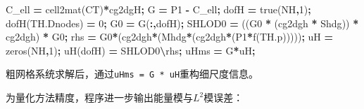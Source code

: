 \documentclass[
]{article}
\newenvironment{Shaded}{\begin{snugshade}}{\end{snugshade}}
\newcommand{\FloatTok}[1]{\textcolor[rgb]{0.00,0.00,0.81}{#1}}
\newcommand{\NormalTok}[1]{#1}
\newcommand{\OperatorTok}[1]{\textcolor[rgb]{0.81,0.36,0.00}{\textbf{#1}}}
\newcommand{\VariableTok}[1]{\textcolor[rgb]{0.00,0.00,0.00}{#1}}
\begin{document}
\begin{Shaded}
\begin{Highlighting}[]
\VariableTok{C\_ell} \OperatorTok{=} \VariableTok{cell2mat}\NormalTok{(}\VariableTok{CT}\NormalTok{)}\OperatorTok{*}\VariableTok{cg2dgH}\OperatorTok{;}
\VariableTok{G} \OperatorTok{=} \VariableTok{P1} \OperatorTok{{-}} \VariableTok{C\_ell}\OperatorTok{;}
\VariableTok{dofH} \OperatorTok{=} \VariableTok{true}\NormalTok{(}\VariableTok{NH}\OperatorTok{,}\FloatTok{1}\NormalTok{)}\OperatorTok{;}
\VariableTok{dofH}\NormalTok{(}\VariableTok{TH}\NormalTok{.}\VariableTok{Dnodes}\NormalTok{) }\OperatorTok{=} \FloatTok{0}\OperatorTok{;}
\VariableTok{G0} \OperatorTok{=} \VariableTok{G}\NormalTok{(}\OperatorTok{:,}\VariableTok{dofH}\NormalTok{)}\OperatorTok{;}
\VariableTok{SHLOD0} \OperatorTok{=}\NormalTok{ ((}\VariableTok{G0}\OperatorTok{\textquotesingle{}} \OperatorTok{*}\NormalTok{ (}\VariableTok{cg2dgh}\OperatorTok{\textquotesingle{}} \OperatorTok{*} \VariableTok{Shdg}\NormalTok{)) }\OperatorTok{*} \VariableTok{cg2dgh}\NormalTok{) }\OperatorTok{*} \VariableTok{G0}\OperatorTok{;}
\VariableTok{rhs} \OperatorTok{=} \VariableTok{G0}\OperatorTok{\textquotesingle{}*}\NormalTok{(}\VariableTok{cg2dgh}\OperatorTok{\textquotesingle{}*}\NormalTok{(}\VariableTok{Mhdg}\OperatorTok{*}\NormalTok{(}\VariableTok{cg2dgh}\OperatorTok{*}\NormalTok{(}\VariableTok{P1}\OperatorTok{*}\VariableTok{f}\NormalTok{(}\VariableTok{TH}\NormalTok{.}\VariableTok{p}\NormalTok{)))))}\OperatorTok{;}
\VariableTok{uH} \OperatorTok{=} \VariableTok{zeros}\NormalTok{(}\VariableTok{NH}\OperatorTok{,}\FloatTok{1}\NormalTok{)}\OperatorTok{;}
\VariableTok{uH}\NormalTok{(}\VariableTok{dofH}\NormalTok{) }\OperatorTok{=} \VariableTok{SHLOD0}\OperatorTok{\textbackslash{}}\VariableTok{rhs}\OperatorTok{;}
\VariableTok{uHms} \OperatorTok{=} \VariableTok{G}\OperatorTok{*}\VariableTok{uH}\OperatorTok{;}
\end{Highlighting}
\end{Shaded}

粗网格系统求解后，通过\texttt{uHms\ =\ G\ *\ uH}重构细尺度信息。

为量化方法精度，程序进一步输出能量模与\(L^2\)模误差：
\end{document}
